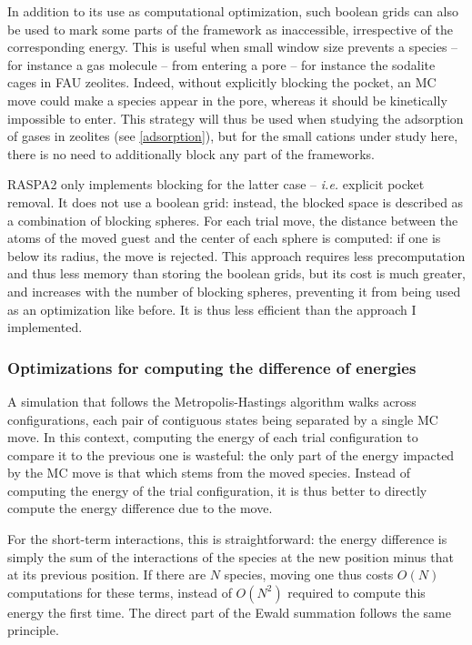 \documentclass[main.tex]{subfiles}
\begin{document}
In addition to its use as computational optimization, such boolean grids can also be used to mark some parts of the framework as inaccessible, irrespective of the corresponding energy. This is useful when small window size prevents a species -- for instance a gas molecule -- from entering a pore -- for instance the sodalite cages in FAU zeolites. Indeed, without explicitly blocking the pocket, an MC move could make a species appear in the pore, whereas it should be kinetically impossible to enter. This strategy will thus be used when studying the adsorption of gases in zeolites (see \autoref{adsorption}), but for the small cations under study here, there is no need to additionally block any part of the frameworks.

RASPA2 only implements blocking for the latter case -- \textit{i.e.} explicit pocket removal. It does not use a boolean grid: instead, the blocked space is described as a combination of blocking spheres. For each trial move, the distance between the atoms of the moved guest and the center of each sphere is computed: if one is below its radius, the move is rejected. This approach requires less precomputation and thus less memory than storing the boolean grids, but its cost is much greater, and increases with the number of blocking spheres, preventing it from being used as an optimization like before. It is thus less efficient than the approach I implemented.

\subsubsection{Optimizations for computing the difference of energies}

A simulation that follows the Metropolis-Hastings algorithm walks across configurations, each pair of contiguous states being separated by a single MC move. In this context, computing the energy of each trial configuration to compare it to the previous one is wasteful: the only part of the energy impacted by the MC move is that which stems from the moved species. Instead of computing the energy of the trial configuration, it is thus better to directly compute the energy difference due to the move.

For the short-term interactions, this is straightforward: the energy difference is simply the sum of the interactions of the species at the new position minus that at its previous position. If there are $N$ species, moving one thus costs $O(N)$ computations for these terms, instead of $O(N^2)$ required to compute this energy the first time. The direct part of the Ewald summation follows the same principle.
\end{document}
